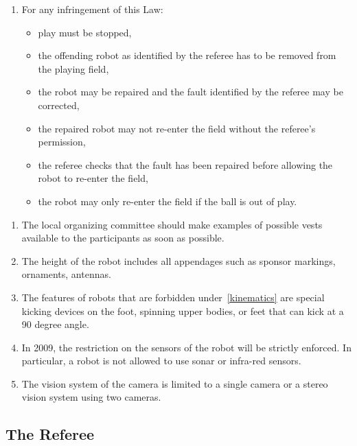 \documentclass[12pt]{article}
\newcounter{law}[section]
\newcommand{\law}[2][Law]{ %
  \refstepcounter{law} %
  \renewcommand\thesubsection{#1-\arabic{law}} %
  \subsection{\hfill #2} %
}
\newenvironment{lawlist}[1][Law]{ %
  \begin{enumerate} %
    \renewcommand{\theenumi}{#1-\arabic{law}.\arabic{enumi}}} %
  {\end{enumerate}}
\newenvironment{decisions}{\underline{\makebox[\textwidth][l]{\textbf{Decisions}}}\begin{enumerate}\renewcommand{\theenumi}{Dec-\arabic{law}.\arabic{enumi}}}{\end{enumerate}}
\begin{document}
\begin{lawlist}
\item For any infringement of this Law:
  \begin{itemize}
  \item play must be stopped,
  \item the offending robot as identified by the referee has to be
    removed from the playing field,
  \item the robot may be repaired and the fault identified by the
    referee may be corrected,
  \item the repaired robot may not re-enter the field without the
    referee's permission,
  \item the referee checks that the fault has been repaired before
    allowing the robot to re-enter the field,
  \item the robot may only re-enter the field if the ball is out of
    play. 
  \end{itemize}
\end{lawlist}

\begin{decisions}
\item The local organizing committee should make examples of possible
  vests available to the participants as soon as possible.

\item The height of the robot includes all appendages such as sponsor
  markings, ornaments, antennas.
  
\item The features of robots that are forbidden under~\ref{kinematics}
  are special kicking devices on the foot, spinning upper bodies, or
  feet that can kick at a 90 degree angle.

\item In 2009, the restriction on the sensors of the robot will be
  strictly enforced. In particular, a robot is not allowed to use
  sonar or infra-red sensors.

\item The vision system of the camera is limited to a single camera or
  a stereo vision system using two cameras.

\end{decisions}

\law{The Referee}
\label{law:referee}
\end{document}
